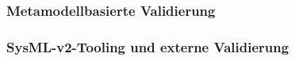 %
%
%
%
%


\subsubsection{Metamodellbasierte Validierung}
\label{sec:metamodel_validation}

%
%
%
%
%
%
%


\subsubsection{SysML-v2-Tooling und externe Validierung}
\label{sec:sysml_tooling}

%
%
%
%
%
%
%
%
%
%


